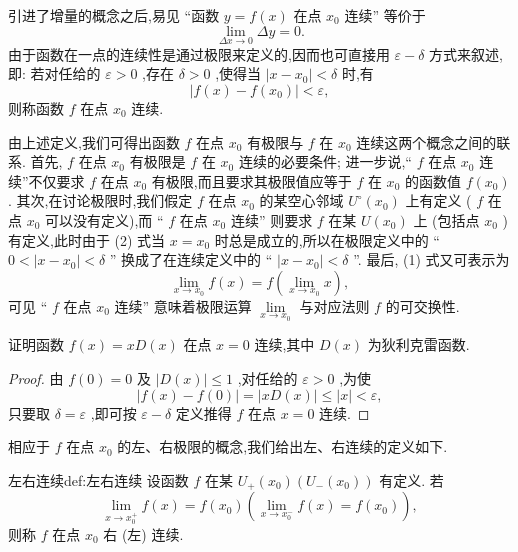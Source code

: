 引进了增量的概念之后,易见 “函数 \(y = f\left( x\right)\) 在点 \({x}_{0}\) 连续” 等价于
\[
\mathop{\lim }\limits_{{{\Delta x} \rightarrow  0}}{\Delta y} = 0.
\]
由于函数在一点的连续性是通过极限来定义的,因而也可直接用 \(\varepsilon  - \delta\) 方式来叙述,即: 若对任给的 \(\varepsilon  > 0\) ,存在 \(\delta  > 0\) ,使得当 \(\left| {x - {x}_{0}}\right|  < \delta\) 时,有
\[
\left| {f\left( x\right)  - f\left( {x}_{0}\right) }\right|  < \varepsilon , \tag{2}
\]
则称函数 \(f\) 在点 \({x}_{0}\) 连续.

由上述定义,我们可得出函数 \(f\) 在点 \({x}_{0}\) 有极限与 \(f\) 在 \({x}_{0}\) 连续这两个概念之间的联系. 首先, \(f\) 在点 \({x}_{0}\) 有极限是 \(f\) 在 \({x}_{0}\) 连续的必要条件; 进一步说,“ \(f\) 在点 \({x}_{0}\) 连续”不仅要求 \(f\) 在点 \({x}_{0}\) 有极限,而且要求其极限值应等于 \(f\) 在 \({x}_{0}\) 的函数值 \(f\left( {x}_{0}\right)\) . 其次,在讨论极限时,我们假定 \(f\) 在点 \({x}_{0}\) 的某空心邻域 \({U}^{ \circ  }\left( {x}_{0}\right)\) 上有定义 ( \(f\) 在点 \({x}_{0}\) 可以没有定义),而 “ \(f\) 在点 \({x}_{0}\) 连续” 则要求 \(f\) 在某 \(U\left( {x}_{0}\right)\) 上 (包括点 \({x}_{0}\) ) 有定义,此时由于 (2) 式当 \(x = {x}_{0}\) 时总是成立的,所以在极限定义中的 “ \(0 < \left| {x - {x}_{0}}\right|  < \delta\) ” 换成了在连续定义中的 “ \(\left| {x - {x}_{0}}\right|  < \delta\) ”. 最后, (1) 式又可表示为
\[
\mathop{\lim }\limits_{{x \rightarrow  {x}_{0}}}f\left( x\right)  = f\left( {\mathop{\lim }\limits_{{x \rightarrow  {x}_{0}}}x}\right) ,
\]
可见 “ \(f\) 在点 \({x}_{0}\) 连续” 意味着极限运算 \(\mathop{\lim }\limits_{{x \rightarrow  {x}_{0}}}\) 与对应法则 \(f\) 的可交换性.

\begin{example}
证明函数 \(f\left( x\right)  = {xD}\left( x\right)\) 在点 \(x = 0\) 连续,其中 \(D\left( x\right)\) 为狄利克雷函数.
\end{example}


\begin{proof}
由 \(f\left( 0\right)  = 0\) 及 \(\left| {D\left( x\right) }\right|  \leq  1\) ,对任给的 \(\varepsilon  > 0\) ,为使
\[
\left| {f\left( x\right)  - f\left( 0\right) }\right|  = \left| {{xD}\left( x\right) }\right|  \leq  \left| x\right|  < \varepsilon ,
\]
只要取 \(\delta  = \varepsilon\) ,即可按 \(\varepsilon  - \delta\) 定义推得 \(f\) 在点 \(x = 0\) 连续.
\end{proof}


相应于 \(f\) 在点 \({x}_{0}\) 的左、右极限的概念,我们给出左、右连续的定义如下.

\begin{definition}{左右连续}{def:左右连续}
设函数 \(f\) 在某 \({U}_{ + }\left( {x}_{0}\right) \left( {{U}_{ - }\left( {x}_{0}\right) }\right)\) 有定义. 若
\[
\mathop{\lim }\limits_{{x \rightarrow  {x}_{0}^{ + }}}f\left( x\right)  = f\left( {x}_{0}\right) \left( {\mathop{\lim }\limits_{{x \rightarrow  {x}_{0}^{ - }}}f\left( x\right)  = f\left( {x}_{0}\right) }\right) ,
\]
则称 \(f\) 在点 \({x}_{0}\) 右 (左) 连续.
\end{definition}


